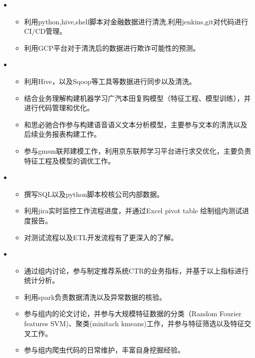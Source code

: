 
  \begin{itemize}[leftmargin=*]
         \item
           {\small
      \begin{itemize}
      \item 利用python,hive,shell脚本对金融数据进行清洗,利用jenkins,git对代码进行CI/CD管理。
          \item 利用GCP平台对于清洗后的数据进行欺诈可能性的预测。
            \end{itemize}
           }
       \item
           {\small
      \begin{itemize}
      \item 利用Hive，以及Sqoop等工具等数据进行同步以及清洗。
         \item 结合业务理解构建机器学习广汽本田复购模型（特征工程、模型训练），并进行代码管理和优化。
          \item 和思必驰合作参与构建语音语义文本分析模型，主要参与文本的清洗以及后续业务报表构建工作。
           \item 参与gmsm联邦建模工作，利用京东联邦学习平台进行求交优化，主要负责特征工程及模型的调优工作。
            \end{itemize}

             }
  \end{itemize}
  \begin{itemize}[leftmargin=*]
     \item
        {\small
      \begin{itemize}
      \item 撰写SQL以及python脚本校核公司内部数据。
        \item 利用jira实时监控工作流程进度，并通过Excel pivot table 绘制组内测试进度报告。
         \item 对测试流程以及ETL开发流程有了更深入的了解。
         
       \end{itemize}
       }
        \item
           {\small
      \begin{itemize}
      \item 通过组内讨论，参与制定推荐系统CTR的业务指标，并基于以上指标进行统计分析。
         \item 利用spark负责数据清洗以及异常数据的核验。
          \item 参与组内的论文讨论，并参与大规模特征数据的分类（Random Fourier features SVM)、聚类(minitach kmeans)工作，并参与特征筛选以及特征交叉工作。
           \item 参与组内爬虫代码的日常维护，丰富自身挖掘经验。

            \end{itemize}

             }

  \end{itemize}


